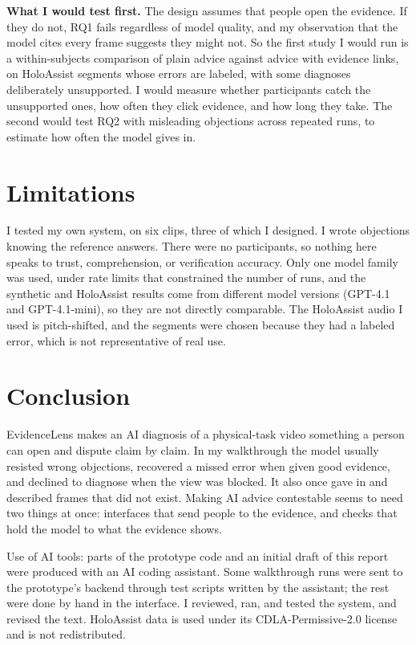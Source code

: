 \documentclass[sigconf]{acmart}
\begin{document}
\textbf{What I would test first.} The design assumes that people open the evidence. If they do not, RQ1 fails regardless of model quality, and my observation that the model cites every frame suggests they might not. So the first study I would run is a within-subjects comparison of plain advice against advice with evidence links, on HoloAssist segments whose errors are labeled, with some diagnoses deliberately unsupported. I would measure whether participants catch the unsupported ones, how often they click evidence, and how long they take. The second would test RQ2 with misleading objections across repeated runs, to estimate how often the model gives in.

\section{Limitations}

I tested my own system, on six clips, three of which I designed. I wrote objections knowing the reference answers. There were no participants, so nothing here speaks to trust, comprehension, or verification accuracy. Only one model family was used, under rate limits that constrained the number of runs, and the synthetic and HoloAssist results come from different model versions (GPT-4.1 and GPT-4.1-mini), so they are not directly comparable. The HoloAssist audio I used is pitch-shifted, and the segments were chosen because they had a labeled error, which is not representative of real use.

\section{Conclusion}

EvidenceLens makes an AI diagnosis of a physical-task video something a person can open and dispute claim by claim. In my walkthrough the model usually resisted wrong objections, recovered a missed error when given good evidence, and declined to diagnose when the view was blocked. It also once gave in and described frames that did not exist. Making AI advice contestable seems to need two things at once: interfaces that send people to the evidence, and checks that hold the model to what the evidence shows.

\begin{acks}
Use of AI tools: parts of the prototype code and an initial draft of this report were produced with an AI coding assistant. Some walkthrough runs were sent to the prototype's backend through test scripts written by the assistant; the rest were done by hand in the interface. I reviewed, ran, and tested the system, and revised the text. HoloAssist data is used under its CDLA-Permissive-2.0 license and is not redistributed.
\end{acks}



\end{document}
